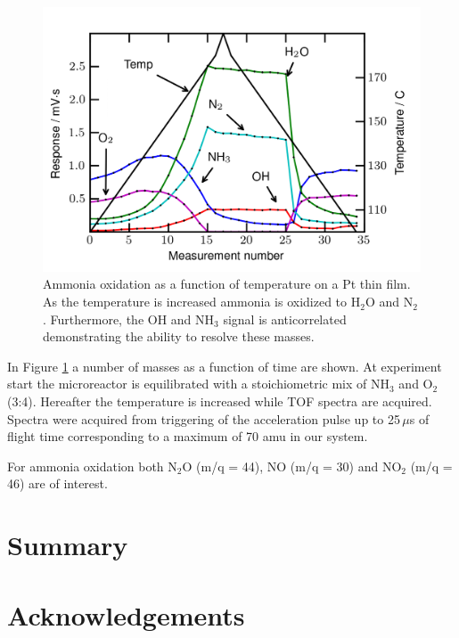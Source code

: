 \documentclass[aip,rsi]{revtex4-1}
\begin{document}
\begin{figure}
 \includegraphics[width=14cm]{ammonia_reactivity.png}%
 \caption{Ammonia oxidation as a function of temperature on a Pt thin film. As the temperature is increased ammonia is oxidized to H$_2$O and N$_2$. Furthermore, the OH and NH$_3$ signal is anticorrelated demonstrating the ability to resolve these masses.\label{fig:ammonia_reactivity}}%
\end{figure}
In Figure \ref{fig:ammonia_reactivity} a number of masses as a function of time are shown. At experiment start the microreactor is equilibrated with a stoichiometric mix of NH$_3$ and O$_2$ (3:4). Hereafter the temperature is increased while TOF spectra are acquired. Spectra were acquired from triggering of the acceleration pulse up to 25\,$\mu$s of flight time corresponding to a maximum of 70 amu in our system. 

For ammonia oxidation both N$_2$O (m/q = 44), NO (m/q = 30) and NO$_2$ (m/q = 46) are of interest. 



\section{Summary}

\section{Acknowledgements}

\end{document}
